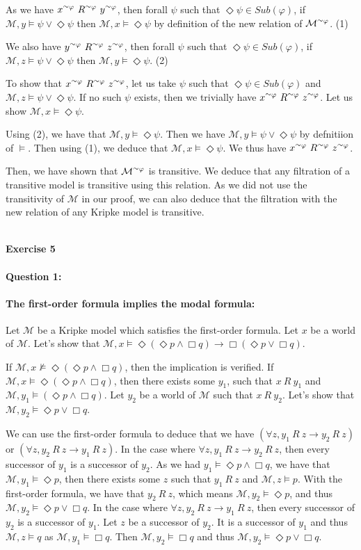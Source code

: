 \documentclass[10pt]{article}
\def\exercise#1{\ \vspace{1cm}\\\Large\textbf{Exercise #1}\normalsize\\}
\def\question#1{\ \vspace{1cm}\\\textbf{Question #1:}\quad}
\def\tilde{\raise.17ex\hbox{$\scriptstyle\sim$}}
\def\M{\mathcal{M}}
\def\tphi{^{\tilde\varphi}}
\begin{document}
As we have $x\tphi\ R\tphi\ y\tphi$, then forall $\psi$ such that $\Diamond\psi\in\mathit{Sub}(\varphi)$, if $\M,y\models\psi\vee\Diamond\psi$ then $\M,x\models\Diamond\psi$ by definition of the new relation of $\M\tphi$. (1)

We also have $y\tphi\ R\tphi\ z\tphi$, then forall $\psi$ such that $\Diamond\psi\in\mathit{Sub}(\varphi)$, if $\M,z\models\psi\vee\Diamond\psi$ then $\M,y\models\Diamond\psi$. (2)

To show that $x\tphi\ R\tphi\ z\tphi$, let us take $\psi$ such that $\Diamond\psi\in\mathit{Sub}(\varphi)$ and $\M,z\models\psi\vee\Diamond\psi$. If no such $\psi$ exists, then we trivially have $x\tphi\ R\tphi\ z\tphi$. Let us show $\M,x\models\Diamond\psi$.

Using (2), we have that $\M,y\models\Diamond\psi$. Then we have $\M,y\models\psi\vee\Diamond\psi$ by defnitiion of $\models$. Then using (1), we deduce that $\M,x\models\Diamond\psi$. We thus have $x\tphi\ R\tphi\ z\tphi$.

Then, we have shown that $\M\tphi$ is transitive. We deduce that any filtration of a transitive model is transitive using this relation. As we did not use the transitivity of $\M$ in our proof, we can also deduce that the filtration with the new relation of any Kripke model is transitive.

\exercise{5}
\question{1}
\paragraph{The first-order formula implies the modal formula:}
Let $\M$ be a Kripke model which satisfies the first-order formula. Let $x$ be a world of $\M$. Let's show that $\M,x\models\Diamond(\Diamond p\wedge\Box q)\rightarrow\Box(\Diamond p\vee\Box q)$.

If $\M,x\not\models\Diamond(\Diamond p\wedge\Box q)$, then the implication is verified. If $\M,x\models\Diamond(\Diamond p\wedge\Box q)$, then there exists some $y_1$, such that $x\ R\ y_1$ and $\M,y_1\models(\Diamond p\wedge\Box q)$. Let $y_2$ be a world of $\M$ such that $x\ R\ y_2$. Let's show that $\M,y_2\models\Diamond p\vee\Box q$.

We can use the first-order formula to deduce that we have $(\forall z,y_1\ R\ z\rightarrow y_2\ R\ z)$ or $(\forall z,y_2\ R\ z\rightarrow y_1\ R\ z)$.
In the case where $\forall z,y_1\ R\ z\rightarrow y_2\ R\ z$, then every successor of $y_1$ is a successor of $y_2$. As we had $y_1\models\Diamond p\wedge\Box q$, we have that $\M,y_1\models\Diamond p$, then there exists some $z$ such that $y_1\ R\ z$ and $\M,z\models p$. With the first-order formula, we have that $y_2\ R\ z$, which means $\M,y_2\models\Diamond p$, and thus $\M,y_2\models\Diamond p\vee\Box q$.
In the case where $\forall z,y_2\ R\ z\rightarrow y_1\ R\ z$, then every successor of $y_2$ is a successor of $y_1$. Let $z$ be a successor of $y_2$. It is a successor of $y_1$ and thus $\M,z\models q$ as $\M,y_1\models\Box q$. Then $\M,y_2\models\Box q$ and thus $\M,y_2\models\Diamond p\vee\Box q$.
\end{document}
